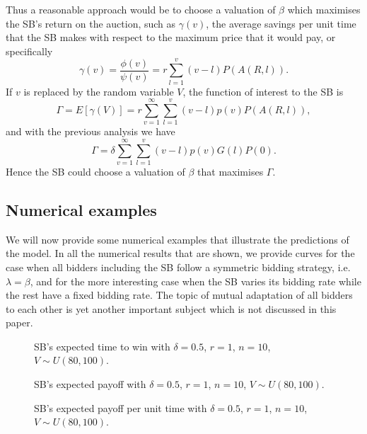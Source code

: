 \documentclass{article}
\begin{document}
Thus a reasonable approach would be to choose a valuation of
$\beta$ which maximises the SB's return on the auction, such as
$\gamma(v)$, the average savings per unit time that the SB makes
with respect to the maximum price that it would pay, or
specifically
\begin{equation}
\gamma(v) = \frac{\phi(v)}{\psi(v)} = r \sum_{l=1}^v
(v-l)P(A(R,l)).
\end{equation}
If $v$ is replaced by the random variable $V$, the function of
interest to the SB is
\begin{equation}\label{SB-objective-av}
\Gamma =E[\gamma(V)]= r\sum_{v=1}^\infty\sum_{l=1}^v
(v-l)p(v)P(A(R,l)),
\end{equation}
and with the previous analysis we have
\begin{equation}
\Gamma = \delta\sum_{v=1}^\infty\sum_{l=1}^v (v-l)p(v)G(l)P(0).
\end{equation}
Hence the SB could choose a valuation of $\beta$ that maximises
$\Gamma$.

\subsection{Numerical examples}

We will now provide some numerical examples that illustrate the
predictions of the model. In all the numerical results that are
shown, we provide curves for the case when all bidders including
the SB follow a symmetric bidding strategy, i.e. $\lambda=\beta$,
and for the more interesting case when the SB varies its bidding
rate while the rest have a fixed bidding rate. The topic of mutual
adaptation of all bidders to each other is yet another important
subject which is not discussed in this paper.

\begin{figure}
\centering
\caption{SB's expected time to win with $\delta=0.5$, $r=1$,
$n=10$, $V\sim U(80,100)$.}\label{fig:ExpTime}
\end{figure}

\begin{figure}
\centering
\caption{SB's expected payoff with $\delta=0.5$, $r=1$, $n=10$,
$V\sim U(80,100)$. }\label{fig:ExpPayoff}
\end{figure}



\begin{figure}
\centering
\caption{SB's expected payoff per unit time with $\delta=0.5$,
$r=1$, $n=10$, $V\sim U(80,100)$. }\label{fig:ExpPayoffPerTime}
\end{figure}
\end{document}
